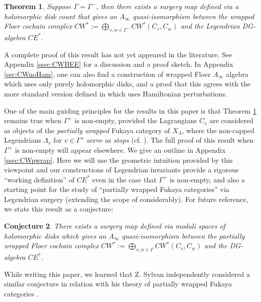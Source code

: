 \documentclass{gtpart}
\newtheorem{thm}{Theorem}
\newtheorem{conj}[thm]{Conjecture}
\begin{document}
\begin{thm}   \label{srgry}  
    Suppose $\Gamma = \Gamma^{-}$, then there exists a surgery map defined via a holomorphic disk count that gives an 
	$A_\infty$ quasi-isomorphism
    between the wrapped Floer cochain complex    
    $CW^* := \bigoplus_{v,w \in \Gamma^{-} } CW^*(C_v, C_w)$
    and the Legendrian DG-algebra $CE^*$.
\end{thm} 

A complete proof of this result has not yet appeared in the literature. See Appendix
\ref{ssec:CWBEE} for a discussion and a proof sketch. In Appendix \ref{sec:CWnoHam}, one can also find a
construction of wrapped Floer $A_\infty$ algebra which uses only purely holomorphic disks, and a proof that this agrees with the more standard version
defined in \cite{AbouzSeidel} which uses Hamiltonian perturbations. 

One of the main guiding principles for the results in this paper is that Theorem \ref{srgry} remains
true when $\Gamma^{+}$ is non-empty, provided the Lagrangians
$C_v$ are considered as objects of the \emph{partially wrapped} Fukaya category of
$X_\Lambda$, where the non-capped Legendrians $\Lambda_v$ for $v \in \Gamma^{+}$ serve as
\emph{stops} (cf. \cite{sylvan}). The full proof of this result when $\Gamma^+$ is non-empty will appear elsewhere. We give an outline in Appendix \ref{ssec:CWpwrap}.
Here we will use the geometric intuition provided by this viewpoint and our constructions of Legendrian invariants provide a rigorous ``working definition'' of
$CE^*$ even in the case that $\Gamma^{+}$ is non-empty, and also a starting point for the study of
``partially wrapped Fukaya categories'' via Legendrian surgery (extending the scope of \cite{BEE} considerably). For future reference, we state this result as a conjecture:

\begin{conj}\label{conjintro} 
	There exists a surgery map defined via moduli spaces of holomorphic disks which gives an $A_\infty$ quasi-isomorphism between the partially wrapped Floer
    cochain complex $CW^* := \bigoplus_{v,w \in \Gamma} CW^*(C_v,C_w)$ and the DG-algebra 
    $CE^*$. 
\end{conj}

While writing this paper, we learned that Z. Sylvan independently considered a similar conjecture \cite{syltalk} in relation with his theory of partially wrapped Fukaya categories \cite{sylvan}.
\end{document}
